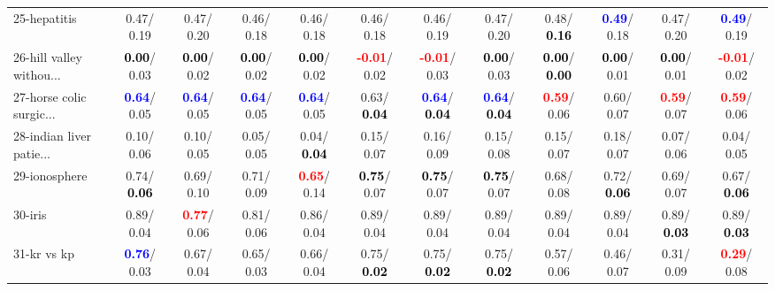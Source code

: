 \begin{table}[h]
\begin{center}
{\begin{tabular}{lc|c|c|c|c|c|c|c|c|c|c}
25-hepatitis &   0.47/  0.19 &   0.47/  0.20 &   0.46/  0.18 &   0.46/  0.18 &   0.46/  0.18 &   0.46/  0.19 &   0.47/  0.20 &   0.48/\textcolor{black}{\textbf{  0.16}} & \textcolor{blue}{\textbf{  0.49}}/  0.18 &   0.47/  0.20 & \textcolor{blue}{\textbf{  0.49}}/  0.19 \\
26-hill valley withou... & \textcolor{black}{\textbf{  0.00}}/  0.03 & \textcolor{black}{\textbf{  0.00}}/  0.02 & \textcolor{black}{\textbf{  0.00}}/  0.02 & \textcolor{black}{\textbf{  0.00}}/  0.02 & \textcolor{red}{\textbf{ -0.01}}/  0.02 & \textcolor{red}{\textbf{ -0.01}}/  0.03 & \textcolor{black}{\textbf{  0.00}}/  0.03 & \textcolor{black}{\textbf{  0.00}}/\textcolor{black}{\textbf{  0.00}} & \textcolor{black}{\textbf{  0.00}}/  0.01 & \textcolor{black}{\textbf{  0.00}}/  0.01 & \textcolor{red}{\textbf{ -0.01}}/  0.02 \\
27-horse colic surgic... & \textcolor{blue}{\textbf{  0.64}}/  0.05 & \textcolor{blue}{\textbf{  0.64}}/  0.05 & \textcolor{blue}{\textbf{  0.64}}/  0.05 & \textcolor{blue}{\textbf{  0.64}}/  0.05 &   0.63/\textcolor{black}{\textbf{  0.04}} & \textcolor{blue}{\textbf{  0.64}}/\textcolor{black}{\textbf{  0.04}} & \textcolor{blue}{\textbf{  0.64}}/\textcolor{black}{\textbf{  0.04}} & \textcolor{red}{\textbf{  0.59}}/  0.06 &   0.60/  0.07 & \textcolor{red}{\textbf{  0.59}}/  0.07 & \textcolor{red}{\textbf{  0.59}}/  0.06 \\
28-indian liver patie... &   0.10/  0.06 &   0.10/  0.05 &   0.05/  0.05 &   0.04/\textcolor{black}{\textbf{  0.04}} &   0.15/  0.07 &   0.16/  0.09 &   0.15/  0.08 &   0.15/  0.07 &   0.18/  0.07 &   0.07/  0.06 &   0.04/  0.05 \\ \hline
29-ionosphere &   0.74/\textcolor{black}{\textbf{  0.06}} &   0.69/  0.10 &   0.71/  0.09 & \textcolor{red}{\textbf{  0.65}}/  0.14 & \textcolor{black}{\textbf{  0.75}}/  0.07 & \textcolor{black}{\textbf{  0.75}}/  0.07 & \textcolor{black}{\textbf{  0.75}}/  0.07 &   0.68/  0.08 &   0.72/\textcolor{black}{\textbf{  0.06}} &   0.69/  0.07 &   0.67/\textcolor{black}{\textbf{  0.06}} \\
30-iris &   0.89/  0.04 & \textcolor{red}{\textbf{  0.77}}/  0.06 &   0.81/  0.06 &   0.86/  0.04 &   0.89/  0.04 &   0.89/  0.04 &   0.89/  0.04 &   0.89/  0.04 &   0.89/  0.04 &   0.89/\textcolor{black}{\textbf{  0.03}} &   0.89/\textcolor{black}{\textbf{  0.03}} \\
31-kr vs kp & \textcolor{blue}{\textbf{  0.76}}/  0.03 &   0.67/  0.04 &   0.65/  0.03 &   0.66/  0.04 &   0.75/\textcolor{black}{\textbf{  0.02}} &   0.75/\textcolor{black}{\textbf{  0.02}} &   0.75/\textcolor{black}{\textbf{  0.02}} &   0.57/  0.06 &   0.46/  0.07 &   0.31/  0.09 & \textcolor{red}{\textbf{  0.29}}/  0.08 \\

\end{tabular}}
\end{center}
\end{table}
